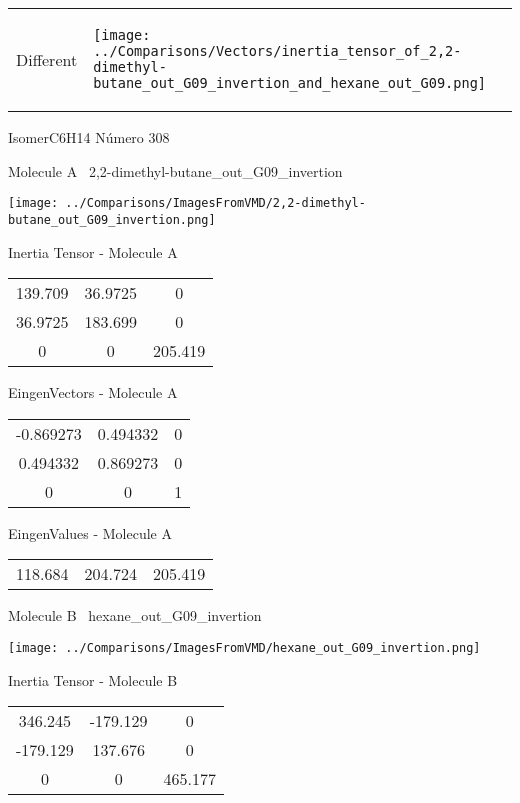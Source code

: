 \vtab[-5mm]
\begin{tabular}{*{2}{m{}}}
\begin{center}
\textcolor{NavyBlue}{\Large Different}
\end{center}
&
\begin{center}
\texttt{[image: ../Comparisons/Vectors/inertia\_tensor\_of\_2,2-dimethyl-butane\_out\_G09\_invertion\_and\_hexane\_out\_G09.png]}
\end{center}
\end{tabular}

 \newpage

\vtab[-3cm]
\begin{center}
{\large IsomerC6H14 \tab Número 308}
\end{center}
\begin{multicols}{2}
\begin{center}

Molecule A \
2,2-dimethyl-butane\_out\_G09\_invertion

\texttt{[image: ../Comparisons/ImagesFromVMD/2,2-dimethyl-butane\_out\_G09\_invertion.png]}

Inertia Tensor - Molecule A \\
\begin{tabular}{|c c c|}
139.709	 & 	36.9725	 & 	0	 \\
36.9725	 & 	183.699	 & 	0	 \\
0	 & 	0	 & 	205.419
\end{tabular}

\vtab
 EingenVectors - Molecule A     \\
\begin{tabular}{|c c c|}
-0.869273	 & 	0.494332	 & 	0	 \\
0.494332	 & 	0.869273	 & 	0	 \\
0	 & 	0	 & 	1
\end{tabular}

\vtab
 EingenValues - Molecule A     \\
\begin{tabular}{|c c c|}
118.684	 & 	204.724	 & 	205.419	 \\
\end{tabular}
\columnbreak

Molecule B \
hexane\_out\_G09\_invertion

\texttt{[image: ../Comparisons/ImagesFromVMD/hexane\_out\_G09\_invertion.png]}

Inertia Tensor - Molecule B \\
\begin{tabular}{|c c c|}
346.245	 & 	-179.129	 & 	0	 \\
-179.129	 & 	137.676	 & 	0	 \\
0	 & 	0	 & 	465.177
\end{tabular}


\end{center}
\end{multicols}
